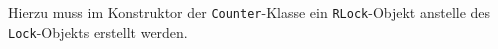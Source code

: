 Hierzu muss im Konstruktor der \lstinline$Counter$-Klasse ein \lstinline$RLock$-Objekt
anstelle des \lstinline$Lock$-Objekts erstellt werden.

